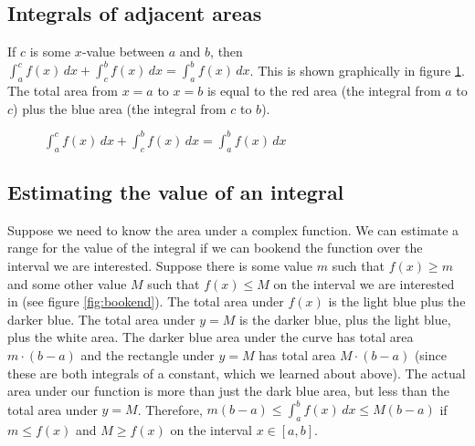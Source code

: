 \subsection{Integrals of adjacent areas}
If $c$ is some $x$-value between $a$ and $b$, then $\int_a^c f(x)\,dx 
+ \int_c^b f(x)\,dx = \int_a^b f(x)\,dx$. This is shown graphically in 
figure \ref{fig:adjacent}. The total area from $x=a$ to $x=b$ is equal 
to the red area (the integral from $a$ to $c$) plus the blue area (the 
integral from $c$ to $b$). 

\begin{figure}[htbp]
	\centering
	\caption{$\int_a^c f(x)\,dx + \int_c^b f(x)\,dx = \int_a^b f(x)\,dx$}
	\label{fig:adjacent}
\end{figure}

\subsection{Estimating the value of an integral}
Suppose we need to know the area under a complex function. We can 
estimate a range for the value of the integral if we can bookend the 
function over the interval we are interested. Suppose there is some 
value $m$ such that $f(x) \geq m$ and some other value $M$ such that 
$f(x) \leq M$ on the interval we are interested in (see figure 
\ref{fig:bookend}). The total area under $f(x)$ is the light blue 
plus the darker blue. The total area under $y=M$ is the darker blue, 
plus the light blue, plus the white area. The darker blue area under 
the curve has total area $m \cdot (b - a)$ and the rectangle under 
$y=M$ has total area $M \cdot (b - a)$ (since these are both integrals 
of a constant, which we learned about above). The actual area under our 
function is more than just the dark blue area, but less than the total 
area under $y=M$. Therefore, $m(b - a) \leq \int_a^b f(x)\,dx \leq 
M(b -a)$ if $m \leq f(x)$ and $M \geq f(x)$ on the interval $x \in 
[a, b]$. 

